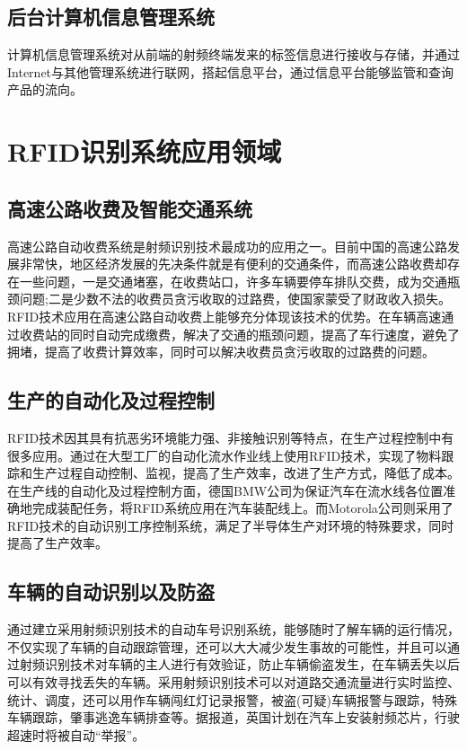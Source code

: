\documentclass[a4paper]{ctexart}
\begin{document}
\begin{spacing}{1.5}
\subsection{后台计算机信息管理系统}
计算机信息管理系统对从前端的射频终端发来的标签信息进行接收与存储，并通过Internet与其他管理系统进行联网，搭起信息平台，通过信息平台能够监管和查询产品的流向。

\section{RFID识别系统应用领域}
\subsection{高速公路收费及智能交通系统}
高速公路自动收费系统是射频识别技术最成功的应用之一。目前中国的高速公路发展非常快，地区经济发展的先决条件就是有便利的交通条件，而高速公路收费却存在一些问题，一是交通堵塞，在收费站口，许多车辆要停车排队交费，成为交通瓶颈问题;二是少数不法的收费员贪污收取的过路费，使国家蒙受了财政收入损失。RFID技术应用在高速公路自动收费上能够充分体现该技术的优势。在车辆高速通过收费站的同时自动完成缴费，解决了交通的瓶颈问题，提高了车行速度，避免了拥堵，提高了收费计算效率，同时可以解决收费员贪污收取的过路费的问题。

\subsection{生产的自动化及过程控制}
RFID技术因其具有抗恶劣环境能力强、非接触识别等特点，在生产过程控制中有很多应用。通过在大型工厂的自动化流水作业线上使用RFID技术，实现了物料跟踪和生产过程自动控制、监视，提高了生产效率，改进了生产方式，降低了成本。在生产线的自动化及过程控制方面，德国BMW公司为保证汽车在流水线各位置准确地完成装配任务，将RFID系统应用在汽车装配线上。而Motorola公司则采用了RFID技术的自动识别工序控制系统，满足了半导体生产对环境的特殊要求，同时提高了生产效率。

\subsection{车辆的自动识别以及防盗}
通过建立采用射频识别技术的自动车号识别系统，能够随时了解车辆的运行情况，不仅实现了车辆的自动跟踪管理，还可以大大减少发生事故的可能性，并且可以通过射频识别技术对车辆的主人进行有效验证，防止车辆偷盗发生，在车辆丢失以后可以有效寻找丢失的车辆。采用射频识别技术可以对道路交通流量进行实时监控、统计、调度，还可以用作车辆闯红灯记录报警，被盗(可疑)车辆报警与跟踪，特殊车辆跟踪，肇事逃逸车辆排查等。据报道，英国计划在汽车上安装射频芯片，行驶超速时将被自动“举报”。


\end{spacing}
\end{document}
